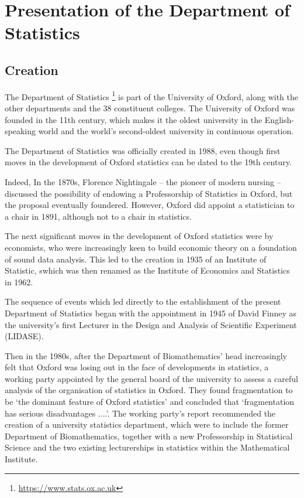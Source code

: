 \chapter{Presentation of the Department of Statistics}


\section{Creation}
\quad The Department of Statistics \footnote{\url{https://www.stats.ox.ac.uk}} is part of the University of Oxford, along with the other departments and the 38 constituent colleges.
The University of Oxford was founded in the 11th century, which makes it the oldest university in the English-speaking world and the world's second-oldest university in continuous operation.

The Department of Statistics was officially created in 1988, even though first moves in the development of Oxford statistics can be dated to the 19th century.

Indeed, In the 1870s, Florence Nightingale -- the pioneer of modern nursing -- discussed the possibility of endowing a Professorship of Statistics in Oxford, but the proposal eventually foundered.
However, Oxford did appoint a statistician to a chair in 1891, although not to a chair in statistics.

The next significant moves in the development of Oxford statistics were by economists, who were increasingly keen to build economic theory on a foundation of sound data analysis.
This led to the creation in 1935 of an Institute of Statistic, swhich was then renamed as the Institute of Economics and Statistics in 1962. 

The sequence of events which led directly to the establishment of the present Department of Statistics began with the appointment in 1945 of David Finney as the university’s first Lecturer in the Design and Analysis of Scientific Experiment (LIDASE).

Then in the 1980s, after the Department of Biomathematics' head increasingly felt that Oxford was losing out in the face of developments in statistics, a working party appointed by the general board of the university to assess a careful analysis of the organisation of statistics in Oxford. 
They found fragmentation to be ‘the dominant feature of Oxford statistics’ and concluded that ‘fragmentation has serious disadvantages ....’.
The working party’s report recommended the creation of a university statistics department, which were to include the former Department of Biomathematics, together with a new Professorship in Statistical Science and the two existing lecturerships in statistics within the Mathematical Institute.

